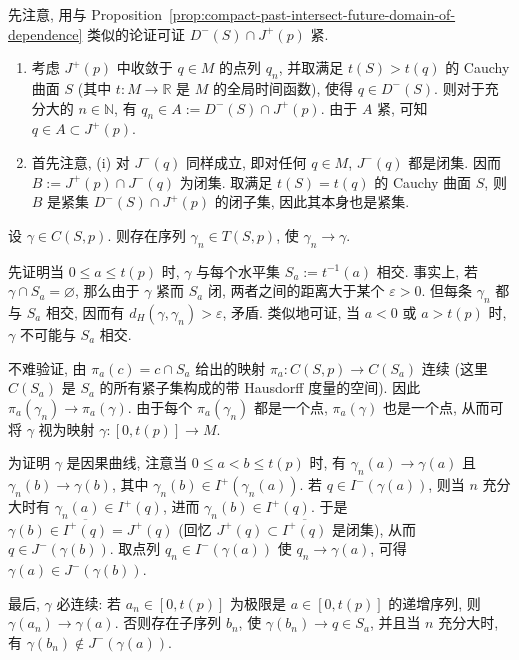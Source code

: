 \begin{description}[font=\normalfont,leftmargin=2em,labelwidth=1.5em]
先注意, 用与 Proposition~\ref{prop:compact-past-intersect-future-domain-of-dependence} 类似的论证可证 $D^-(S)\cap J^+(p)$ 紧.
\begin{enumerate}[label=(\roman*),ref=\roman*,leftmargin=*]
\item 考虑 $J^+(p)$ 中收敛于 $q\in M$ 的点列 $q_n$, 并取满足 $t(S)>t(q)$ 的 Cauchy 曲面 $S$ (其中 $t:M\to\mathbb{R}$ 是 $M$ 的全局时间函数), 使得 $q\in D^-(S)$. 则对于充分大的 $n\in\mathbb{N}$, 有 $q_n\in A:=D^-(S)\cap J^+(p)$. 由于 $A$ 紧, 可知 $q\in A\subset J^+(p)$.
\item 首先注意, (i) 对 $J^-(q)$ 同样成立, 即对任何 $q\in M$, $J^-(q)$ 都是闭集. 因而 $B:=J^+(p)\cap J^-(q)$ 为闭集. 取满足 $t(S)=t(q)$ 的 Cauchy 曲面 $S$, 则 $B$ 是紧集 $D^-(S)\cap J^+(p)$ 的闭子集, 因此其本身也是紧集.
\end{enumerate}

设 $\gamma\in C(S,p)$. 则存在序列 $\gamma_n\in T(S,p)$, 使 $\gamma_n\to\gamma$.

先证明当 $0\leq a\leq t(p)$ 时, $\gamma$ 与每个水平集 $S_a:=t^{-1}(a)$ 相交. 事实上, 若 $\gamma\cap S_a=\varnothing$, 那么由于 $\gamma$ 紧而 $S_a$ 闭, 两者之间的距离大于某个 $\varepsilon>0$. 但每条 $\gamma_n$ 都与 $S_a$ 相交, 因而有 $d_H(\gamma,\gamma_n)>\varepsilon$, 矛盾. 类似地可证, 当 $a<0$ 或 $a>t(p)$ 时, $\gamma$ 不可能与 $S_a$ 相交.

不难验证, 由 $\pi_a(c)=c\cap S_a$ 给出的映射 $\pi_a:C(S,p)\to C(S_a)$ 连续 (这里 $C(S_a)$ 是 $S_a$ 的所有紧子集构成的带 Hausdorff 度量的空间). 因此 $\pi_a(\gamma_n)\to\pi_a(\gamma)$. 由于每个 $\pi_a(\gamma_n)$ 都是一个点, $\pi_a(\gamma)$ 也是一个点, 从而可将 $\gamma$ 视为映射 $\gamma:[0,t(p)]\to M$.

为证明 $\gamma$ 是因果曲线, 注意当 $0\leq a<b\leq t(p)$ 时, 有 $\gamma_n(a)\to\gamma(a)$ 且 $\gamma_n(b)\to\gamma(b)$, 其中 $\gamma_n(b)\in I^+(\gamma_n(a))$. 若 $q\in I^-(\gamma(a))$, 则当 $n$ 充分大时有 $\gamma_n(a)\in I^+(q)$, 进而 $\gamma_n(b)\in I^+(q)$. 于是 $\gamma(b)\in\overline{I^+(q)}=J^+(q)$ (回忆 $J^+(q)\subset\overline{I^+(q)}$ 是闭集), 从而 $q\in J^-(\gamma(b))$. 取点列 $q_n\in I^-(\gamma(a))$ 使 $q_n\to\gamma(a)$, 可得 $\gamma(a)\in J^-(\gamma(b))$.

最后, $\gamma$ 必连续: 若 $a_n\in[0,t(p)]$ 为极限是 $a\in[0,t(p)]$ 的递增序列, 则 $\gamma(a_n)\to\gamma(a)$. 否则存在子序列 $b_n$, 使 $\gamma(b_n)\to q\in S_a$, 并且当 $n$ 充分大时, 有 $\gamma(b_n)\notin J^-(\gamma(a))$.


\end{description}
